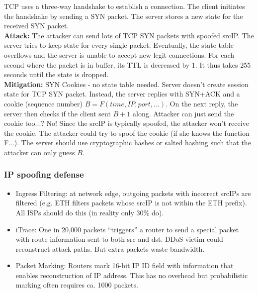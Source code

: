 \documentclass[11pt,oneside,a4paper]{article}
\begin{document}
TCP uses a three-way handshake to establish a connection. The client initiates the handshake by sending a SYN packet. The server stores a new state for the received SYN packet.\\
\noindent \textbf{Attack:} The attacker can send lots of TCP SYN packets with spoofed srcIP. The server tries to keep state for every single packet. Eventually, the state table overflows and the server is unable to accept new legit connections. For each second where the packet is in buffer, its TTL is decreased by 1. It thus takes 255 seconds until the state is dropped.\\
\noindent \textbf{Mitigation:} SYN Cookies - no state table needed. Server doesn't create session state for TCP SYN packet. Instead, the server replies with SYN+ACK and a cookie (sequence number) $B=F(time,IP,port,...)$. On the next reply, the server then checks if the client sent $B+1$ along. Attacker can just send the cookie too...? No! Since the srcIP is typically spoofed, the attacker won't receive the cookie. The attacker could try to spoof the cookie (if she knows the function F...). The server should use cryptographic hashes or salted hashing such that the attacker can only guess $B$.

\subsubsection{IP spoofing defense}
\label{ip_spoofing_defense}

\vspace{-\topsep}
\begin{itemize}
	\setlength{\itemsep}{0pt}
	\setlength{\parskip}{0pt}
	\item Ingress Filtering: at network edge, outgoing packets with incorrect srcIPs are filtered (e.g. ETH filters packets whose srcIP is not within the ETH prefix). All ISPs should do this (in reality only 30\% do).
	\item iTrace: One in 20,000 packets “triggers” a router to send a special packet with route information sent to both src and dst. DDoS victim could reconstruct attack paths. But extra packets waste bandwidth.
	\item Packet Marking: Routers mark 16-bit IP ID field with information that enables reconstruction of IP address. This has no overhead but probabilistic marking often requires ca. 1000 packets.
\end{itemize}
\vspace{-\topsep}
\end{document}
